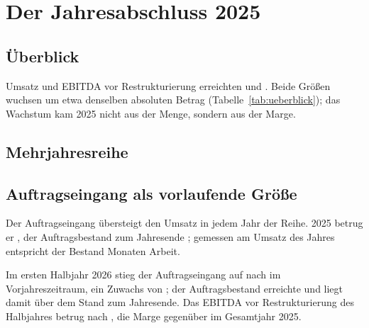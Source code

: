 \section{Der Jahresabschluss 2025}
\label{sec:abschluss}

\subsection{\"Uberblick}

\ueberblicktabelle

Umsatz und EBITDA vor Restrukturierung erreichten  und
. Beide Gr\"o{\ss}en wuchsen um etwa denselben absoluten Betrag
(Tabelle~\ref{tab:ueberblick}); das Wachstum kam 2025 nicht aus der Menge, sondern aus
der Marge.

\subsection{Mehrjahresreihe}

\reihentabelle

\subsection{Auftragseingang als vorlaufende Gr\"o{\ss}e}

Der Auftragseingang \"ubersteigt den Umsatz in jedem Jahr der Reihe. 2025 betrug er
, der Auftragsbestand zum Jahresende
; gemessen am Umsatz des Jahres entspricht der
Bestand \Auftragsreichweite{} Monaten Arbeit.

Im ersten Halbjahr 2026 stieg der Auftragseingang auf  nach
 im Vorjahreszeitraum, ein Zuwachs von
\HjAuftragWachstum; der Auftragsbestand erreichte  und liegt
damit \"uber dem Stand zum Jahresende. Das EBITDA vor Restrukturierung des
Halbjahres betrug  nach , die Marge
\HjMarge{} gegen\"uber \Pz{\EbitdaMarge} im Gesamtjahr 2025.


